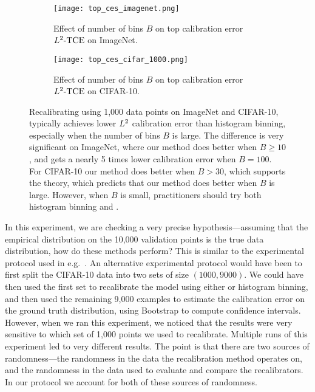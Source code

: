 \begin{figure}
  \centering
  \centering
  	 \begin{subfigure}[b]{0.48\textwidth}
         \centering
         \texttt{[image: top\_ces\_imagenet.png]}
         \caption{Effect of number of bins $B$ on top calibration error $L^2\textup{-TCE}$ on ImageNet.
         }
         \label{fig:imagenet_top_cal_var_red}
     \end{subfigure}
     \hfill
     \begin{subfigure}[b]{0.48\textwidth}
         \centering
         \texttt{[image: top\_ces\_cifar\_1000.png]}
         \caption{Effect of number of bins $B$ on top calibration error $L^2\textup{-TCE}$ on CIFAR-10.
         }
         \label{fig:cifar_top_cal_var_red}
     \end{subfigure}
  \caption{
    Recalibrating using 1,000 data points on ImageNet and CIFAR-10, \ourcal{} typically achieves lower $L^2$ calibration error than histogram binning, especially when the number of bins $B$ is large. The difference is very significant on ImageNet, where our method does better when $B \geq 10$, and gets a nearly 5 times lower calibration error when $B = 100$. For CIFAR-10 our method does better when $B > 30$, which supports the theory, which predicts that our method does better when $B$ is large. However, when $B$ is small, practitioners should try both histogram binning and \ourcal{}.
}
  \label{fig:mse_estimators_bins}
\end{figure}

In this experiment, we are checking a very precise hypothesis---assuming that the empirical distribution on the 10,000 validation points is the true data distribution, how do these methods perform? This is similar to the experimental protocol used in e.g.~\cite{brocker2012empirical}.
An alternative experimental protocol would have been to first split the CIFAR-10 data into two sets of size $(1000, 9000)$.
We could have then used the first set to recalibrate the model using either \ourcal{} or histogram binning, and then used the remaining 9,000 examples to estimate the calibration error on the ground truth distribution, using Bootstrap to compute confidence intervals.
However, when we ran this experiment, we noticed that the results were very sensitive to which set of 1,000 points we used to recalibrate.
Multiple runs of this experiment led to very different results.
The point is that there are two sources of randomness---the randomness in the data the recalibration method operates on, and the randomness in the data used to evaluate and compare the recalibrators.
In our protocol we account for both of these sources of randomness.


